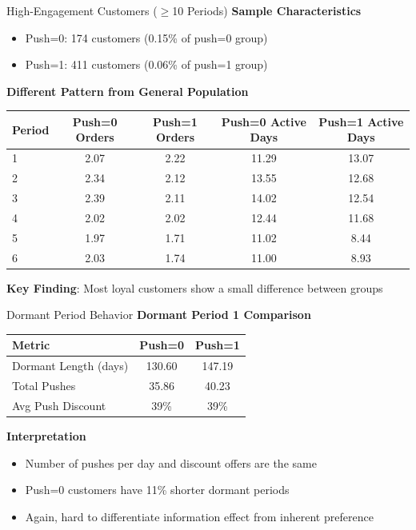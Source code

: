 \documentclass[aspectratio=169]{beamer}  %
\begin{document}
\begin{frame}{High-Engagement Customers ($\geq$10 Periods)}
\textbf{Sample Characteristics}
\begin{itemize}
    \item Push=0: 174 customers (0.15\% of push=0 group)
    \item Push=1: 411 customers (0.06\% of push=1 group)
\end{itemize}

\vspace{0.2cm}
\textbf{Different Pattern from General Population}
\begin{table}
\centering
\scriptsize
\begin{tabular}{lcccc}
\toprule
Period & Push=0 Orders & Push=1 Orders & Push=0 Active Days & Push=1 Active Days \\
\midrule
1 & 2.07 & 2.22 & 11.29 & 13.07 \\
2 & 2.34 & 2.12 & 13.55 & 12.68 \\
3 & 2.39 & 2.11 & 14.02 & 12.54 \\
4 & 2.02 & 2.02 & 12.44 & 11.68 \\
5 & 1.97 & 1.71 & 11.02 & 8.44 \\
6 & 2.03 & 1.74 & 11.00 & 8.93 \\
\bottomrule
\end{tabular}
\end{table}

\textbf{Key Finding}: Most loyal customers show a small difference between groups
\end{frame}

\begin{frame}{Dormant Period Behavior}
\textbf{Dormant Period 1 Comparison}
\begin{table}
\centering
\begin{tabular}{lcc}
\toprule
Metric & Push=0 & Push=1 \\
\midrule
Dormant Length (days) & 130.60 & 147.19 \\
Total Pushes & 35.86 & 40.23 \\
Avg Push Discount & 39\% & 39\% \\
\bottomrule
\end{tabular}
\end{table}

\vspace{0.3cm}
\textbf{Interpretation}
\begin{itemize}
    \item Number of pushes per day and discount offers are the same
    \item Push=0 customers have 11\% shorter dormant periods
    \item Again, hard to differentiate information effect from inherent preference
\end{itemize}
\end{frame}
\end{document}

